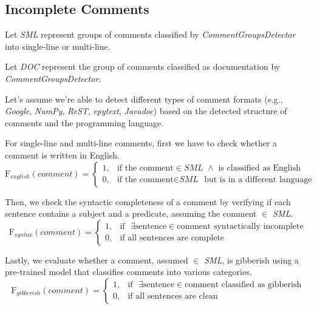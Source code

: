 \subsection{Incomplete Comments}
Let \textit{SML} represent groups of comments classified by \textit{CommentGroupsDetector} into single-line or multi-line.

\noindent Let \textit{DOC} represent the group of comments classified as documentation by \textit{CommentGroupsDetector}.

\noindent Let's assume we're able to detect different types of comment formats (e.g., \textit{Google}, \textit{NumPy}, \textit{ReST}, \textit{epytext}, \textit{Javadoc}) based on the detected structure of comments and the programming language.

\noindent For single-line and multi-line comments, first we have to check whether a comment is written in English.
\begin{equation*}
	\mathrm{F}_{english}(comment) = \begin{cases}
		1, & \text{if the comment} \in \textit{SML } \wedge \text{ is classified as English} \\
		0, & \text{if the comment} \in \textit{SML } \text{ but is in a different language}
	\end{cases}
\end{equation*}

\noindent Then, we check the syntactic completeness of a comment by verifying if each sentence contains a subject and a predicate, assuming the comment $\in$ \textit{SML}.
\begin{equation*}
	\mathrm{F}_{syntax}(comment) = \begin{cases}
		1, & \text{if  } \exists \text{sentence} \in \text{comment syntactically incomplete} \\
		0, & \text{if all sentences are complete}
	\end{cases}
\end{equation*}

\noindent Lastly, we evaluate whether a comment, assumed $\in$ \textit{SML}, is gibberish using a pre-trained model \cite{gibberishDetector} that classifies comments into various categories.
\begin{equation*}
	\mathrm{F}_{gibberish}(comment) = \begin{cases}
		1, & \text{if  } \exists \text{sentence} \in \text{comment classified as gibberish} \\
		0, & \text{if all sentences are clean}
	\end{cases}
\end{equation*}

